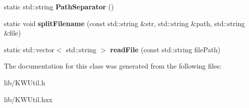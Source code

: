 \begin{DoxyCompactItemize}
\item 
\hypertarget{class_k_w_util_a19d7a4b4320a3b9d8ff06e4d296e2893}{static std\-::string {\bfseries Path\-Separator} ()}\label{class_k_w_util_a19d7a4b4320a3b9d8ff06e4d296e2893}

\item 
\hypertarget{class_k_w_util_afe6ad66b5fe06a8b42918634076ab056}{static void {\bfseries split\-Filename} (const std\-::string \&str, std\-::string \&path, std\-::string \&file)}\label{class_k_w_util_afe6ad66b5fe06a8b42918634076ab056}

\item 
\hypertarget{class_k_w_util_a70a639cebc8982645a9ba44f73b93d85}{static std\-::vector$<$ std\-::string $>$ {\bfseries read\-File} (const std\-::string file\-Path)}\label{class_k_w_util_a70a639cebc8982645a9ba44f73b93d85}

\end{DoxyCompactItemize}


The documentation for this class was generated from the following files\-:\begin{DoxyCompactItemize}
\item 
lib/K\-W\-Util.\-h\item 
lib/K\-W\-Util.\-hxx\end{DoxyCompactItemize}
